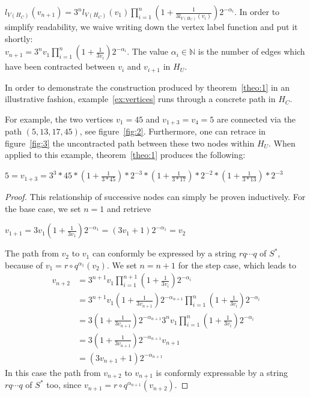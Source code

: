 \par\medskip
\begin{theorem}
	\label{theo:1}
	$l_{V(H_C)}(v_{n+1})=3^nl_{V(H_C)}(v_1)\prod_{i=1}^{n}\left(1+\frac{1}{3l_{V(H_C)}(v_{i})}\right)2^{-\alpha_i}$.
	In order to simplify readability, we waive writing down the vertex label function and put it shortly:\\
	$v_{n+1}=3^nv_1\prod_{i=1}^{n}\left(1+\frac{1}{3v_{i}}\right)2^{-\alpha_i}$.
	The value $\alpha_i\in\mathbb{N}$ is the number of edges which have been contracted between $v_i$ and $v_{i+1}$ in $H_U$.
\end{theorem}

In order to demonstrate the construction produced by theorem~\ref{theo:1} in an illustrative fashion, example~\ref{ex:vertices} runs through a concrete path in $H_C$.

\par\medskip
\begin{example}
	\label{ex:vertices}
	For example, the two vertices $v_1=45$ and $v_{1+3}=v_4=5$ are 
	connected
	via the path $(5,13,17,45)$, see figure~\ref{fig:2}. Furthermore, one
	can retrace in figure~\ref{fig:3} the uncontracted path between these
	two nodes within $H_U$. When applied to this example,
	theorem~\ref{theo:1} produces the following:	
	\begin{center}
		$5=v_{1+3}=3^3*45*\left(1+\frac{1}{3*45}\right)*2^{-3}
		*\left(1+\frac{1}{3*17}\right)*2^{-2}
		*\left(1+\frac{1}{3*13}\right)*2^{-3}$
	\end{center} 
\end{example}
\begin{proof}
	\label{proof:1}
	This relationship of successive nodes can simply be proven inductively. For the base case, we set $n=1$ and retrieve
	\begin{center}
		$v_{1+1}=3v_1\left(1+\frac{1}{3v_1}\right)2^{-\alpha_1}
		=\left(3v_1+1\right)2^{-\alpha_1}=v_2$
	\end{center}
	The path from $v_2$ to $v_1$ can conformly be expressed by a string $rq\cdots q$ of $S^*$, because of $v_1=r\circ q^{\alpha_1}\left(v_2\right)$. We set $n=n+1$ for the step case, which leads to
	\begin{equation*}
	\begin{array}{cl}
	v_{n+2} &
	=3^{n+1}v_1\prod_{i=1}^{n+1}\left(1+\frac{1}{3v_i}\right)2^{-\alpha_i}\\
	&
	=3^{n+1}v_1\left(1+\frac{1}{3v_{n+1}}\right)2^{-\alpha_{n+1}}\prod_{i=1}^{n}\left(1+\frac{1}{3v_i}\right)2^{-\alpha_i}\\
	&
	=3\left(1+\frac{1}{3v_{n+1}}\right)2^{-\alpha_{n+1}}3^nv_1\prod_{i=1}^{n}\left(1+\frac{1}{3v_i}\right)2^{-\alpha_i}\\
	&
	=3\left(1+\frac{1}{3v_{n+1}}\right)2^{-\alpha_{n+1}}v_{n+1}\\
	&
	=\left(3v_{n+1}+1\right)2^{-\alpha_{n+1}}
	\end{array}
	\end{equation*}
	In this case the path from $v_{n+2}$ to $v_{n+1}$ is conformly 
	expressable by a string $rq\cdots q$ of $S^*$ too, since
	$v_{n+1}=r\circ q^{\alpha_{n+1}}\left(v_{n+2}\right)$.
\end{proof}

